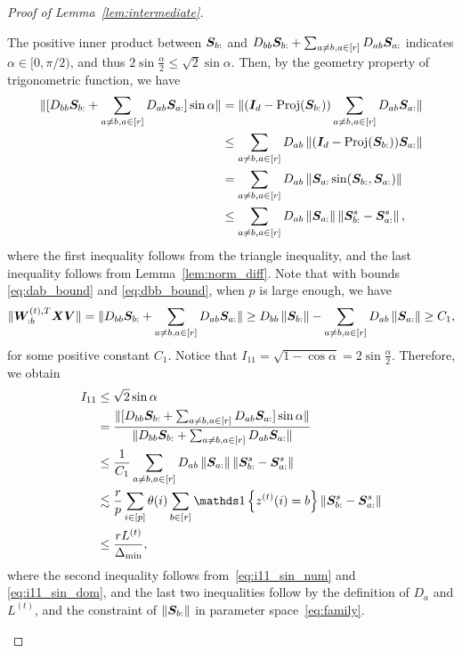 \documentclass[lettersize,onecolumn,journal]{IEEEtran}
\theoremstyle{definition}
\theoremstyle{definition}
\newcommand{\offf}[1]{\left\{#1\right\}}
\begin{document}
\begin{proof}[Proof of Lemma~\ref{lem:intermediate}]
\begin{enumerate}[wide]
    The positive inner product between $\bm S_{b:}$ and $D_{bb} \bm S_{b:} + \sum_{a \neq b, a \in [r]} D_{ab} \bm S_{a:}$ indicates $\alpha \in [0,  \pi/2)$, and thus $2\sin \frac{\alpha}{2} \leq \sqrt{2} \sin \alpha$. Then, by the geometry property of trigonometric function, we have 
    \begin{align}
       \onormSize{}{ [D_{bb} \mS_{b:} + \sum_{a \neq b, a \in [r]} D_{ab} \mS_{a:}] \sin \alpha} &= \onormSize{}{(\mI_d - \text{Proj}(\mS_{b:})) \sum_{a \neq b, a \in [r]} D_{ab} \mS_{a:}}\\
       &\leq \sum_{a \neq b, a \in [r]} D_{ab} \onorm{(\mI_d - \text{Proj}(\mS_{b:}))\mS_{a:}  }\\
       &= \sum_{a \neq b, a \in [r]} D_{ab} \onorm{ \mS_{a:} \sin (\mS_{b:}, \mS_{a:}) }\\
       & \leq \sum_{a \neq b, a \in [r]} D_{ab} \onorm{\mS_{a:}} \onorm{ \mS^s_{b:} - \mS^s_{a:}}, \label{eq:i11_sin_num}
    \end{align}
    where the first inequality follows from the triangle inequality, and the last inequality follows from Lemma~\ref{lem:norm_diff}. Note that with bounds \eqref{eq:dab_bound} and \eqref{eq:dbb_bound}, when $p$ is large enough, we have 
    \begin{equation}\label{eq:i11_sin_dom}
           \onormSize{}{\mW_{:b}^{(t), T} \mX \mV } = \onormSize{}{ D_{bb} \mS_{b:} + \sum_{a \neq b, a \in [r]} D_{ab} \mS_{a:}}  \geq D_{bb} \onorm{\mS_{b:}} - \sum_{a \neq b, a \in [r]} D_{ab} \onorm{ \mS_{a:}} \geq  C_1,
    \end{equation}
    for some positive constant $C_1$. Notice that $I_{11} = \sqrt{1 - \cos \alpha} = 2 \sin \frac{\alpha}{2}$. Therefore, we obtain
    \begin{align}
        I_{11} &\leq \sqrt{2} \sin \alpha \\
        & = \frac{  \onormSize{}{ [D_{bb} \mS_{b:} + \sum_{a \neq b, a \in [r]} D_{ab} \mS_{a:}] \sin \alpha}}{  \onormSize{}{ D_{bb} \mS_{b:} + \sum_{a \neq b, a \in [r]} D_{ab} \mS_{a:}} } \\
        & \leq \frac{ 1}{ C_1}  \sum_{a \neq b, a \in [r]} D_{ab} \onorm{\mS_{a:}} \onorm{ \mS^s_{b:} - \mS^s_{a:}} \\
        & \lesssim \frac{r}{p} \sum_{i \in [p]} \theta(i) \sum_{b \in [r]} \ind\offf{z^{(t)}(i) = b} \onorm{ \mS^s_{b:} - \mS^s_{a:}}\\
        & \leq \frac{r L^{(t)}}{\Delta_{\min}},\label{eq:i11}
    \end{align}
    where the second inequality follows from~\eqref{eq:i11_sin_num} and \eqref{eq:i11_sin_dom}, and the last two inequalities follow by the definition of $D_a$ and $L^{(t)}$, and the constraint of $\left\lVert\bm S_{b:}\right\rVert$ in parameter space~\eqref{eq:family}.
    

\end{enumerate}
\end{proof}
\end{document}
